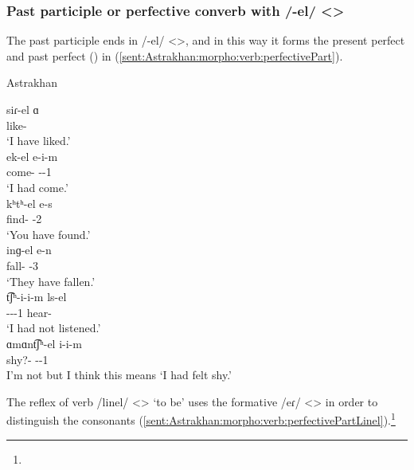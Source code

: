 \subsubsection{Past participle or perfective converb with /-el/ <>}

The past participle ends in /-el/ <>, and in this way it forms the present perfect and past perfect () in (\ref{sent:Astrakhan:morpho:verb:perfectivePart}). 

\begin{exe}
	\ex Astrakhan \label{sent:Astrakhan:morpho:verb:perfectivePart}
	\begin{xlist}
		\ex \gll siɾ-el ɑ \\ 
		like-{\perfcvb} {\aux} \\
		\trans `I have liked.' \\ 
		\ex \gll ek-el e-i-m \\ 
		come-{\perfcvb} {\aux}-{\pst}-1{\sg} \\
		\trans `I had come.' \\ 
		\ex \gll kʰtʰ-el e-s\\ 
		find-{\perfcvb} {\aux}-2{\sg} \\
		\trans `You have found.' \\ 
		\ex \gll inɡ-el e-n\\ 
		fall-{\perfcvb} {\aux}-3{\pl} \\
		\trans `They have fallen.' \\ 
		\ex \gll t͡ʃʰ-i-i-m ls-el \\ 
		{\neggloss}-{\aux}-{\pst}-1{\sg} hear-{\perfcvb}\\
		\trans `I had not listened.' \\
		\ex \gll ɑmɑnt͡ʃʰ-el i-i-m \\ 
		shy?-{\perfcvb} {\aux}-{\pst}-1{\sg} \\
		\trans I'm not but I think this means `I had felt shy.' \\
	\end{xlist}
\end{exe}

The reflex of verb /linel/ <> `to be' uses the formative  /eɾ/ <> in order to distinguish the consonants (\ref{sent:Astrakhan:morpho:verb:perfectivePartLinel}).\footnote{}


